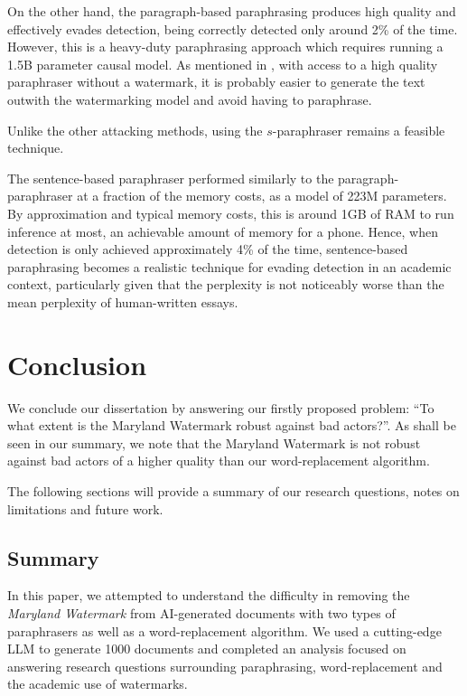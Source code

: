 \documentclass{l4proj}
\theoremstyle{definition}
\begin{document}
    On the other hand, the paragraph-based paraphrasing produces high quality and effectively evades detection, being correctly detected only around 2\% of the time. However, this is a heavy-duty paraphrasing approach which requires running a 1.5B parameter causal model. As mentioned in \citet{kirchenbauer2023watermark}, with access to a high quality paraphraser without a watermark, it is probably easier to generate the text outwith the watermarking model and avoid having to paraphrase.

    Unlike the other attacking methods, using the $s$-paraphraser remains a feasible technique. 

    The sentence-based paraphraser performed similarly to the paragraph-paraphraser at a fraction of the memory costs, as a model of 223M parameters. By approximation and typical memory costs, this is around 1GB of RAM to run inference at most, an achievable amount of memory for a phone. Hence, when detection is only achieved approximately 4\% of the time, sentence-based paraphrasing becomes a realistic technique for evading detection in an academic context, particularly given that the perplexity is not noticeably worse than the mean perplexity of human-written essays.

\chapter{Conclusion}
We conclude our dissertation by answering our firstly proposed problem: ``To what extent is the Maryland Watermark robust against bad actors?''. As shall be seen in our summary, we note that the Maryland Watermark is not robust against bad actors of a higher quality than our word-replacement algorithm.

The following sections will provide a summary of our research questions, notes on limitations and future work.
\section{Summary}
    In this paper, we attempted to understand the difficulty in removing the \emph{Maryland Watermark} from AI-generated documents with two types of paraphrasers as well as a word-replacement algorithm. We used a cutting-edge LLM to generate 1000 documents and completed an analysis focused on answering research questions surrounding paraphrasing, word-replacement and the academic use of watermarks.
    
\end{document}
